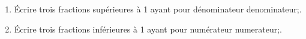 \documentclass[exercice]{thedocument}%
\begin{document}
%
\begin{enumerate}
    \item Écrire trois fractions supérieures à 1 ayant pour dénominateur
    \<denominateur;.
    \item Écrire trois fractions inférieures à 1 ayant pour numérateur
    \<numerateur;.
\end{enumerate}
\end{document}

